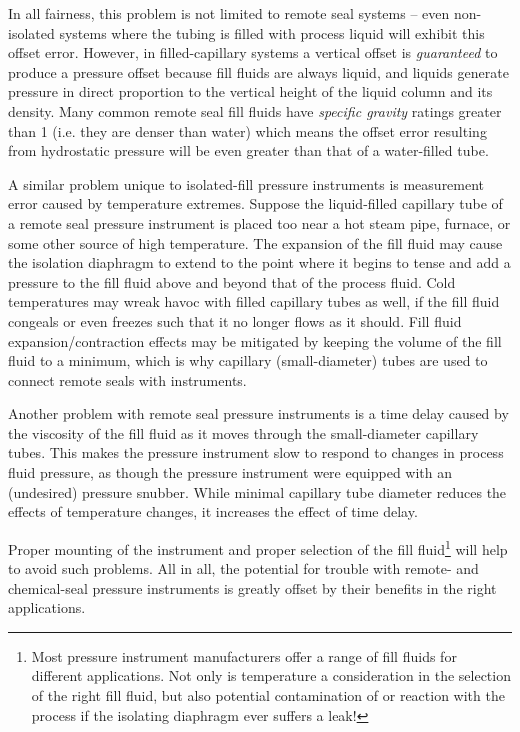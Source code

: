 In all fairness, this problem is not limited to remote seal systems -- even non-isolated systems where the tubing is filled with process liquid will exhibit this offset error.  However, in filled-capillary systems a vertical offset is \textit{guaranteed} to produce a pressure offset because fill fluids are always liquid, and liquids generate pressure in direct proportion to the vertical height of the liquid column and its density.  Many common remote seal fill fluids have \textit{specific gravity} ratings greater than 1 (i.e. they are denser than water) which means the offset error resulting from hydrostatic pressure will be even greater than that of a water-filled tube.  

A similar problem unique to isolated-fill pressure instruments is measurement error caused by temperature extremes.  Suppose the liquid-filled capillary tube of a remote seal pressure instrument is placed too near a hot steam pipe, furnace, or some other source of high temperature.  The expansion of the fill fluid may cause the isolation diaphragm to extend to the point where it begins to tense and add a pressure to the fill fluid above and beyond that of the process fluid.  Cold temperatures may wreak havoc with filled capillary tubes as well, if the fill fluid congeals or even freezes such that it no longer flows as it should.  Fill fluid expansion/contraction effects may be mitigated by keeping the volume of the fill fluid to a minimum, which is why capillary (small-diameter) tubes are used to connect remote seals with instruments.

Another problem with remote seal pressure instruments is a time delay caused by the viscosity of the fill fluid as it moves through the small-diameter capillary tubes.  This makes the pressure instrument slow to respond to changes in process fluid pressure, as though the pressure instrument were equipped with an (undesired) pressure snubber.  While minimal capillary tube diameter reduces the effects of temperature changes, it increases the effect of time delay.

Proper mounting of the instrument and proper selection of the fill fluid\footnote{Most pressure instrument manufacturers offer a range of fill fluids for different applications.  Not only is temperature a consideration in the selection of the right fill fluid, but also potential contamination of or reaction with the process if the isolating diaphragm ever suffers a leak!} will help to avoid such problems.  All in all, the potential for trouble with remote- and chemical-seal pressure instruments is greatly offset by their benefits in the right applications.

